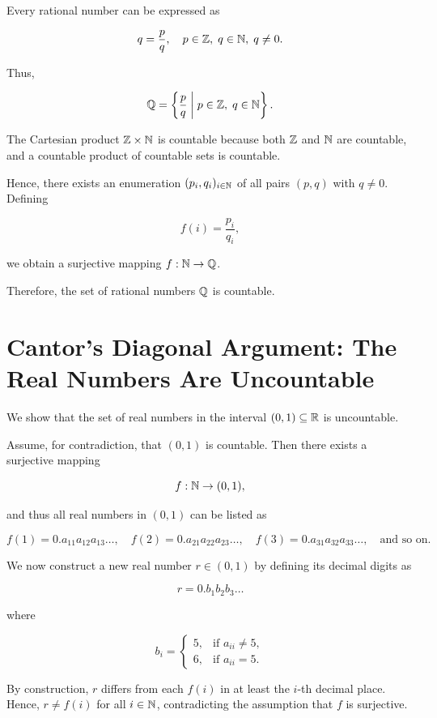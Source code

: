 Every rational number can be expressed as

\[
	q = \frac{p}{q}, \quad p \in \mathbb{Z}, \; q \in \mathbb{N}, \; q \neq 0.
\]

Thus,

\[
	\mathbb{Q} = \left\{ \frac{p}{q} \; \middle| \; p \in \mathbb{Z}, \; q \in \mathbb{N} \right\}.
\]

The Cartesian product \( \mathbb{Z} \times \mathbb{N} \) is countable because both \( \mathbb{Z} \) and \( \mathbb{N} \) are countable, and a countable
product of countable sets is countable.

Hence, there exists an enumeration \( (p_i, q_i)_{i \in \mathbb{N}} \) of all pairs \( (p, q) \) with \( q \neq 0 \).
Defining

\[
	f(i) = \frac{p_i}{q_i},
\]

we obtain a surjective mapping \( f : \mathbb{N} \to \mathbb{Q} \).

Therefore, the set of rational numbers \( \mathbb{Q} \) is countable.

\QED

\section{Cantor's Diagonal Argument: The Real Numbers Are Uncountable}

We show that the set of real numbers in the interval \( (0,1) \subseteq \mathbb{R} \) is uncountable.

Assume, for contradiction, that \( (0,1) \) is countable.
Then there exists a surjective mapping

\[
	f : \mathbb{N} \to (0,1),
\]

and thus all real numbers in \( (0,1) \) can be listed as

\[
	f(1) = 0.a_{11}a_{12}a_{13}\ldots, \quad
	f(2) = 0.a_{21}a_{22}a_{23}\ldots, \quad
	f(3) = 0.a_{31}a_{32}a_{33}\ldots, \quad \text{and so on.}
\]

We now construct a new real number \( r \in (0,1) \) by defining its decimal digits as

\[
	r = 0.b_1 b_2 b_3 \ldots
\]

where

\[
	b_i =
	\begin{cases}
		5, & \text{if } a_{ii} \neq 5, \\
		6, & \text{if } a_{ii} = 5.
	\end{cases}
\]

By construction, \( r \) differs from each \( f(i) \) in at least the \( i \)-th decimal place.
Hence, \( r \neq f(i) \) for all \( i \in \mathbb{N} \), contradicting the assumption that \( f \) is surjective.

